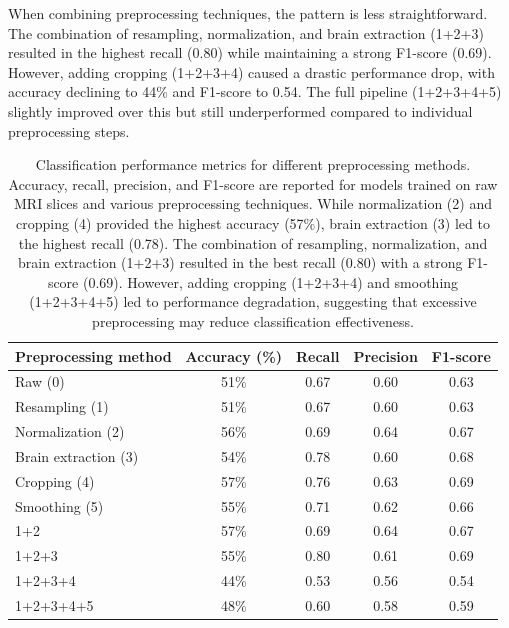 When combining preprocessing techniques, the pattern is less straightforward. The combination of resampling, normalization, and brain extraction (1+2+3) resulted in the highest recall (0.80) while maintaining a strong F1-score (0.69). However, adding cropping (1+2+3+4) caused a drastic performance drop, with accuracy declining to 44\% and F1-score to 0.54. The full pipeline (1+2+3+4+5) slightly improved over this but still underperformed compared to individual preprocessing steps.
\begin{center}
	\begin{table}[t]
		\centering
		\caption{\label{tab:model_metrics_preprocessing}Classification performance metrics for different preprocessing methods. Accuracy, recall, precision, and F1-score are reported for models trained on raw MRI slices and various preprocessing techniques. While normalization (2) and cropping (4) provided the highest accuracy (57\%), brain extraction (3) led to the highest recall (0.78). The combination of resampling, normalization, and brain extraction (1+2+3) resulted in the best recall (0.80) with a strong F1-score (0.69). However, adding cropping (1+2+3+4) and smoothing (1+2+3+4+5) led to performance degradation, suggesting that excessive preprocessing may reduce classification effectiveness.}
		\begin{tabular*}{500pt}{@{\extracolsep\fill}lcccc@{\extracolsep\fill}}
			\toprule
		     \textbf{Preprocessing method} &\textbf{Accuracy (\%)} &  \textbf{Recall} &\textbf{Precision} &\textbf{F1-score}\\
			\midrule
			Raw (0) & 51\% & 0.67 & 0.60 & 0.63 \\
			Resampling (1) & 51\% & 0.67 & 0.60 & 0.63 \\
			Normalization (2) & 56\% & 0.69 & 0.64 & 0.67 \\
			Brain extraction (3) & 54\% & 0.78 & 0.60 & 0.68 \\
			Cropping (4) & 57\% & 0.76 & 0.63 & 0.69 \\
			Smoothing (5) & 55\% & 0.71 & 0.62 & 0.66 \\
            1+2 & 57\% & 0.69 & 0.64 & 0.67 \\
            1+2+3 & 55\% & 0.80 & 0.61 & 0.69 \\
            1+2+3+4 & 44\% & 0.53 & 0.56 & 0.54 \\
            1+2+3+4+5 & 48\% & 0.60 & 0.58 & 0.59 \\
			\bottomrule
		\end{tabular*}
	\end{table}
\end{center}

